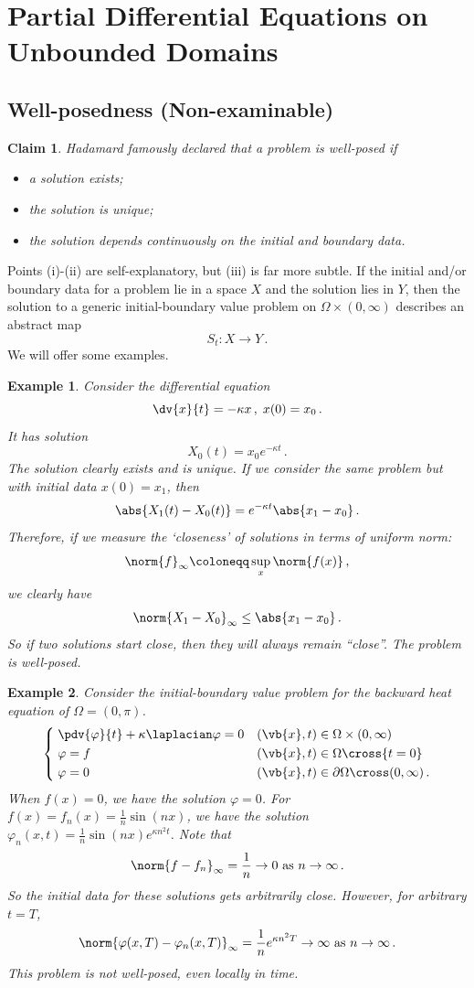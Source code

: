 \documentclass{article}
\theoremstyle{plain}\theoremheaderfont{\normalfont\itshape}\theorembodyfont{\rmfamily}\theoremseparator{.}\newtheorem*{rem}{Remark}\newtheorem*{ex}{Example}\newtheorem*{proof}{Proof}\newtheorem*{altp}{Alternative proof}
\theoremstyle{plain}\theoremheaderfont{\normalfont\bfseries}\theorembodyfont{\rmfamily}\theoremseparator{.}\newtheorem{thm}{Theorem}[section]\newtheorem{lem}[thm]{Lemma}\newtheorem{prop}[thm]{Proposition}\newtheorem*{cor}{Corollary}\newtheorem{defn}[thm]{Definition}\newtheorem{clm}[thm]{Claim}\newtheorem{clminproof}{Claim}
\theoremstyle{break}\theoremheaderfont{\normalfont\itshape}\theorembodyfont{\rmfamily}\theoremseparator{.\medskip}\newtheorem*{proofskip}{Proof}\newtheorem*{exs}{Examples}\newtheorem*{rems}{Remarks}
\theoremstyle{break}\theoremheaderfont{\normalfont\bfseries}\theorembodyfont{\rmfamily}\theoremseparator{.\medskip}\newtheorem{lemskip}[thm]{Lemma}\newtheorem{defnskip}[thm]{Definition}\newtheorem{propskip}[thm]{Proposition}\newtheorem{thmskip}[thm]{Theorem}
\numberwithin{equation}{section}
\begin{document}
	\newpage

	\section{Partial Differential Equations on Unbounded Domains}
	\subsection{Well-posedness (Non-examinable)}
	\begin{clm}
		Hadamard famously declared that a problem is well-posed if
		\begin{itemize}[topsep=0pt]
			\item[(i)] a solution exists;
			\item[(ii)] the solution is unique;
			\item[(iii)] the solution depends continuously on the initial and boundary data.
		\end{itemize}
	\end{clm}
	Points (i)-(ii) are self-explanatory, but (iii) is far more subtle. If the initial and/or boundary data for a problem lie in a space \(X\) and the solution lies in \(Y\), then the solution to a generic initial-boundary value problem on \(\Omega\times(0,\infty)\) describes an abstract map
	\[S_t:X\to Y\,.\]
	We will offer some examples.
	\begin{ex}
		Consider the differential equation
		\[\dv{x}{t}=-\kappa x\,,\;x(0)=x_0\,.\]
		It has solution
		\[X_0(t)=x_0e^{-\kappa t}\,.\]
		The solution clearly exists and is unique. If we consider the same problem but with initial data \(x(0)=x_1\), then
		\[\abs{X_1(t)-X_0(t)}=e^{-\kappa t}\abs{x_1-x_0}\,.\]
		Therefore, if we measure the `closeness' of solutions in terms of \textit{uniform norm}:
		\[\norm{f}_\infty\coloneqq\sup_{x}\norm{f(x)}\,,\]
		we clearly have
		\[\norm{X_1-X_0}_\infty\le\abs{x_1-x_0}\,.\]
		So if two solutions start close, then they will always remain “close”. The problem is well-posed.
	\end{ex}
	\begin{ex}
		Consider the initial-boundary value problem for the backward heat equation of \(\Omega=(0,\pi)\).
		\[\left\{\begin{aligned}
			& \;\pdv{\varphi}{t}+\kappa\laplacian\varphi=0 && (\vb{x},t)\in\Omega\times(0,\infty)\\
			& \;\varphi=f && (\vb{x},t)\in\Omega\cross\{t=0\}\\
			& \;\varphi=0 && (\vb{x},t)\in\partial\Omega\cross(0,\infty)\,.
		\end{aligned}\right.\]
		When \(f(x)=0\), we have the solution \(\varphi=0\). For \(f(x)=f_n(x)=\frac{1}{n}\sin(nx)\), we have the solution \(\varphi_n(x,t)=\frac{1}{n}\sin(nx)e^{\kappa n^2t}\). Note that
		\[\norm{f-f_n}_\infty=\frac{1}{n}\to 0\text{ as }n\to\infty\,.\]
		So the initial data for these solutions gets arbitrarily close. However, for arbitrary \(t=T\),
		\[\norm{\varphi(x,T)-\varphi_n(x,T)}_\infty=\frac{1}{n}e^{\kappa n^2T}\to\infty\text{ as }n\to\infty\,.\]
		This problem is not well-posed, even locally in time.
	\end{ex}
\end{document}
